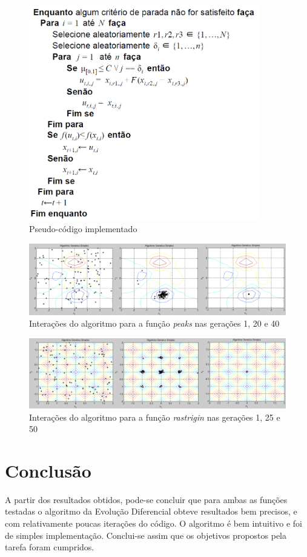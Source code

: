 \documentclass[12pt]{elsarticle}
\begin{document}
	\pagebreak
	\begin{figure}[h]
		\centering
		\includegraphics[width=10cm]{img/pseudo-code.png}
		\caption{Pseudo-código implementado}
		\label{fig:pseudo-code}
	\end{figure}
	\begin{figure}[h]
		\centering
		\includegraphics[width=17cm]{img/peaks.png}
		\caption{Interações do algoritmo para a função \textit{peaks} nas gerações 1, 20 e 40}
		\label{fig:peaks}
	\end{figure}
	\begin{figure}[h]
		\centering
		\includegraphics[width=17cm]{img/rastrigin.png}
		\caption{Interações do algoritmo para a função \textit{rastrigin} nas gerações 1, 25 e 50}
		\label{fig:rastrigin}
	\end{figure}
	
	\pagebreak
	\section{Conclusão}
	A partir dos resultados obtidos, pode-se concluir que para ambas as funções testadas o algoritmo da Evolução Diferencial obteve resultados bem precisos, e com relativamente poucas iterações do código. O algoritmo é bem intuitivo e foi de simples implementação. Conclui-se assim que os objetivos propostos pela tarefa foram cumpridos.
	
\end{document}
